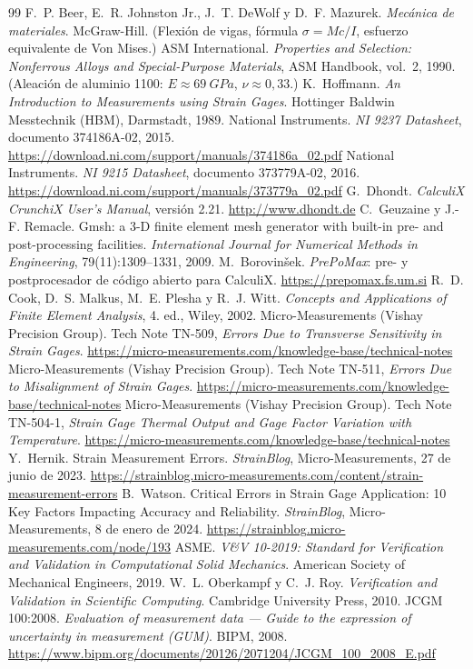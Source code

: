 \documentclass[11pt,a4paper]{article}
\begin{document}
\begin{thebibliography}{99}
 F.~P. Beer, E.~R. Johnston Jr., J.~T. DeWolf y D.~F. Mazurek. \emph{Mec\'anica de materiales}. McGraw-Hill. (Flexi\'on de vigas, f\'ormula $\sigma=Mc/I$, esfuerzo equivalente de Von Mises.)
 ASM International. \emph{Properties and Selection: Nonferrous Alloys and Special-Purpose Materials}, ASM Handbook, vol.~2, 1990. (Aleaci\'on de aluminio 1100: $E\approx\SI{69}{GPa}$, $\nu\approx0{,}33$.)
 K.~Hoffmann. \emph{An Introduction to Measurements using Strain Gages}. Hottinger Baldwin Messtechnik (HBM), Darmstadt, 1989.
 National Instruments. \emph{NI 9237 Datasheet}, documento 374186A-02, 2015. \url{https://download.ni.com/support/manuals/374186a_02.pdf}
 National Instruments. \emph{NI 9215 Datasheet}, documento 373779A-02, 2016. \url{https://download.ni.com/support/manuals/373779a_02.pdf}
 G.~Dhondt. \emph{CalculiX CrunchiX User's Manual}, versi\'on 2.21. \url{http://www.dhondt.de}
 C.~Geuzaine y J.-F. Remacle. Gmsh: a 3-D finite element mesh generator with built-in pre- and post-processing facilities. \emph{International Journal for Numerical Methods in Engineering}, 79(11):1309--1331, 2009.
 M.~Borovin\v{s}ek. \emph{PrePoMax}: pre- y postprocesador de c\'odigo abierto para CalculiX. \url{https://prepomax.fs.um.si}
 R.~D. Cook, D.~S. Malkus, M.~E. Plesha y R.~J. Witt. \emph{Concepts and Applications of Finite Element Analysis}, 4.\textordfeminine{} ed., Wiley, 2002.
 Micro-Measurements (Vishay Precision Group). Tech Note TN-509, \emph{Errors Due to Transverse Sensitivity in Strain Gages}. \url{https://micro-measurements.com/knowledge-base/technical-notes}
 Micro-Measurements (Vishay Precision Group). Tech Note TN-511, \emph{Errors Due to Misalignment of Strain Gages}. \url{https://micro-measurements.com/knowledge-base/technical-notes}
 Micro-Measurements (Vishay Precision Group). Tech Note TN-504-1, \emph{Strain Gage Thermal Output and Gage Factor Variation with Temperature}. \url{https://micro-measurements.com/knowledge-base/technical-notes}
 Y.~Hernik. Strain Measurement Errors. \emph{StrainBlog}, Micro-Measurements, 27 de junio de 2023. \url{https://strainblog.micro-measurements.com/content/strain-measurement-errors}
 B.~Watson. Critical Errors in Strain Gage Application: 10 Key Factors Impacting Accuracy and Reliability. \emph{StrainBlog}, Micro-Measurements, 8 de enero de 2024. \url{https://strainblog.micro-measurements.com/node/193}
 ASME. \emph{V\&V 10-2019: Standard for Verification and Validation in Computational Solid Mechanics}. American Society of Mechanical Engineers, 2019.
 W.~L. Oberkampf y C.~J. Roy. \emph{Verification and Validation in Scientific Computing}. Cambridge University Press, 2010.
 JCGM 100:2008. \emph{Evaluation of measurement data --- Guide to the expression of uncertainty in measurement (GUM)}. BIPM, 2008. \url{https://www.bipm.org/documents/20126/2071204/JCGM_100_2008_E.pdf}
\end{thebibliography}
\end{document}
